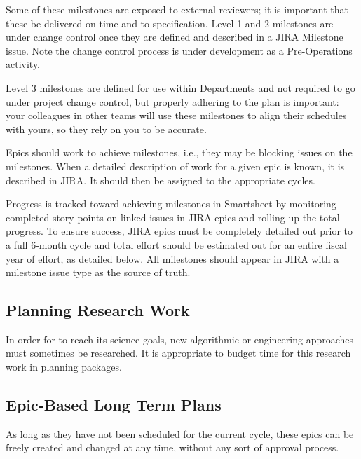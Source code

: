 \begin{itemize}
Some of these milestones are exposed to external reviewers; it is important that these be delivered on time and to specification.
Level 1 and 2 milestones are under change control once they are defined and described in a \gls{JIRA} Milestone issue. Note the change control process is under development as a Pre-Operations activity.

Level 3 milestones are defined for use within Departments and not required to go under project change control, but properly adhering to the plan is important: your colleagues in other teams will use these milestones to align their schedules with yours, so they rely on you to be accurate.

Epics should work to achieve milestones, i.e., they may be blocking issues on the milestones.
When a detailed description of work for a given \gls{epic} is known, it is described in \gls{JIRA}.
It should then be assigned to the appropriate \glspl{cycle}.

Progress is tracked toward achieving milestones in Smartsheet by monitoring completed story points on linked issues in \gls{JIRA} epics and rolling up the total progress.
To ensure success, \gls{JIRA} epics must be completely detailed out prior to a full 6-month cycle and total effort should be estimated out for an entire fiscal year of effort, as detailed below.
All milestones should appear in \gls{JIRA} with a milestone issue type as the source of truth.

\subsection{Planning Research Work}
\label{sec:long-term-research}

In order for \RO  to reach its science goals, new algorithmic or engineering approaches must sometimes be researched.
It is appropriate to budget time for this research work in planning packages.

\subsection{Epic-Based Long Term Plans}

As long as they have not been scheduled for the current \gls{cycle}, these \glspl{epic} can be freely created and changed at any time, without any sort of approval process.


\end{itemize}
